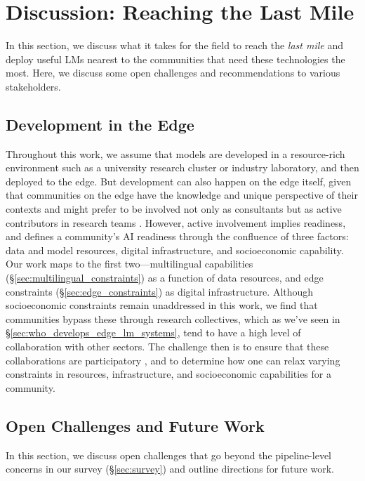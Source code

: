 \documentclass[11pt,a4paper]{article}
\begin{document}
\section{Discussion: Reaching the Last Mile}
\label{sec:discussion}

In this section, we discuss what it takes for the field to reach the \textit{last mile} and deploy useful LMs
nearest to the communities that need these technologies the most.
Here, we discuss some open challenges and recommendations to various stakeholders.

\subsection{Development in the Edge}
Throughout this work, we assume that models are developed in a resource-rich environment such as a university research cluster or industry laboratory, and then deployed to the edge.
But development can also happen on the edge itself, given that communities on the edge have the knowledge and unique perspective of their contexts and might prefer to be involved not only as consultants but as active contributors in research teams \citep{pillai-etal-2023-community}.
However, active involvement implies readiness, and \citet{occhini2026artificialintelligencecreatingnew} defines a community's AI readiness through the confluence of three factors: data and model resources, digital infrastructure, and socioeconomic capability.
Our work maps to the first two---multilingual capabilities (\S\ref{sec:multilingual_constraints}) as a function of data resources, and edge constraints (\S\ref{sec:edge_constraints}) as digital infrastructure.
Although socioeconomic constraints remain unaddressed in this work,
we find that communities bypass these through research collectives, which as we've seen in \S\ref{sec:who_develops_edge_lm_systems}, tend to have a high level of collaboration with other sectors.
The challenge then is to ensure that these collaborations are participatory \citep{petti2025coact}, and to determine how one can relax varying constraints in resources, infrastructure, and socioeconomic capabilities for a community.

\subsection{Open Challenges and Future Work}

In this section, we discuss open challenges that go beyond the pipeline-level concerns in our survey (\S\ref{sec:survey}) and outline directions for future work.
\end{document}

